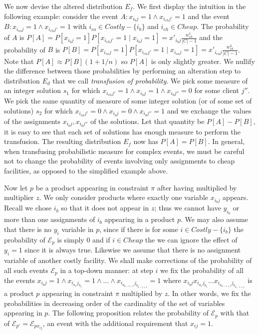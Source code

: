 \documentclass[11pt]{article}
\begin{document}
We now  devise the altered  distribution $E_f$.  We first  display the
intuition in the following example: consider the event $A \colon x_{i_bj}=1
\wedge x_{i_{ch}j'}=1$ and the event $B \colon x_{i_{co}j}=1 \wedge
x_{i_{ch}j'}=1$  with  $i_{co}\in   Costly-\{i_b\}$  and  $i_{ch}  \in
Cheap$.         The        probability        of         $A$        is
$P[A]=P[x_{i_bj}=1]P[x_{i_{ch}j'}=1 \mid x_{i_bj}=1]=x'_{i_bj}\frac{w^1_{ch}}{|C|-1}$
and         the          probability         of         $B$         is
$P[B]=P[x_{i_{co}j}=1]P[x_{i_{ch}j'}=1 \mid x_{i_{co}j}=1]=x'_{i_{co}j}\frac{w^2_{ch}}{|C|-1}$.
Note  that  $P[A]\approx  P[B](1+1/n)$  so  $P[A]$  is  only  slightly
greater.  We nullify  the  difference between  those probabilities  by
performing  an alteration  step  to distribution  $E_d$  that we  call
\emph{transfusion of probability}. We  pick some measure of an integer
solution  $s_1$  for which  $x_{i_{ch}j'}=1  \wedge x_{i_bj}=1  \wedge
x_{i_bj''}=0$  for some  client $j''$.  We pick  the same  quantity of
measure of some  integer solution (or of some  set of solutions) $s_2$
for which  $x_{i_{ch}j'}=0 \wedge x_{i_bj}=0  \wedge x_{i_bj''}=1$ and
we exchange the values of the assignments $x_{i_bj},x_{i_bj''}$ of the solutions.
  Let that quantity be $P[A]-P[B]$, it is easy to
see  that each  set of  solutions has  enough measure  to  perform the
transfusion. The resulting distribution  $E_f$ now has $P[A]=P[B]$. In
general, when transfusing probabilistic measure for complex events, we
must be  careful not  to change the  probability of  events involving
only  assignments to cheap facilities, as opposed to the simplified
example above.

Now let  $p$ be a product  appearing in constraint  $\pi$ after having
multiplied by multiplier $z$.  We only consider products where exactly
one variable $x_{i_bj}$  appears. Recall we chose   $i_b$ so that it
does not appear in $z$; thus  
we  cannot have  $y_{i_b}$ or  more  than one
assignments  of $i_b$ appearing  in a  product $p.$
  We  may also  assume  that there  is no  $y_i$
variable in $p$, since if  there is for some $i\in Costly-\{i_b\}$ the
probability of $\mathcal{E}_p$ is simply $0$ and if $i\in Cheap$ the we can ignore
the effect of $y_i=1$ since it is always true. Likewise we assume that
there is no assignment variable  of another costly facility. We shall
make corrections of the probability of all such events $\mathcal{E}_p$ in a
top-down manner: at step $i$ we  fix the probability of all the events
$x_{i_bj}=1  \wedge  x_{i_{a_1}j_{b_1}}=1       \wedge   \ldots \wedge x_{i_{a_{k-i+1}}j_{b_{k-i+1}}}=1$     where    $x_{i_bj}
x_{i_{a_1}j_{b_1}}
\ldots x_{i_{a_{k-i+1}}j_{b_{k-i+1}}}$ is a product $p$
appearing in constraint $\pi$ multiplied by $z$. In other words, we fix
the probabilities  in decreasing order  of the cardinality of  the set
of variables appearing in $p$.  The following proposition relates the
probability       of      $\mathcal{E}_p$      with       that      of
$\mathcal{E}_{p'}=\mathcal{E}_{px_{ij}}$, an event with the additional
requirement that  $x_{ij}=1$.
\end{document}
